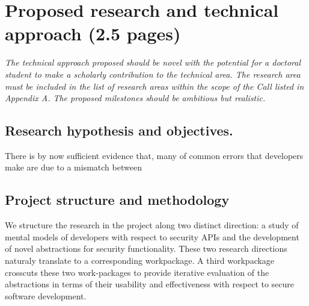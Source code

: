 \documentclass[10pt]{article}
\begin{document}

\section{Proposed research and technical approach (2.5 pages)}

\emph{The technical approach proposed should be novel with the potential for a doctoral student to make a scholarly contribution to the technical area. The research area must be included in the list of research areas within the scope of the Call listed in Appendix A. The proposed milestones should be ambitious but realistic.}




%

\subsection{Research hypothesis and objectives.}


There is by now sufficient evidence that, many of common errors that developers make are due to a mismatch between 






\subsection{Project structure and methodology}


We structure the research in the project along two distinct direction: a study of mental models of developers with respect to security APIs and the development of novel abstractions for security functionality.  These two research directions naturaly translate to a corresponding workpackage. 
A third workpackage crosscuts these two work-packages to provide iterative evaluation of the abstractions in terms of their usability and effectiveness with respect to secure software development.
\end{document}
